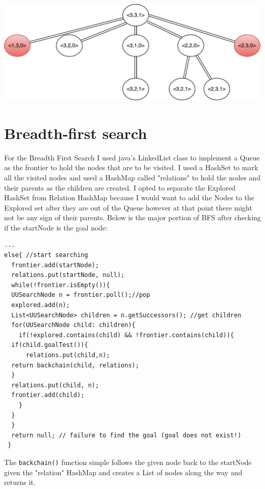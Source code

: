\documentclass{article}
\begin{document}
\includegraphics[scale=0.75]{states2}

\section{Breadth-first search}
For the Breadth First Search I used java's LinkedList class to implement a Queue as the frontier to hold the nodes that are to be visited.
I used a HashSet to mark all the visited nodes and used a HashMap called "relations" to hold the nodes and their parents as the children are created. I opted to separate the Explored HashSet from Relation HashMap because I would want to add the Nodes to the Explored set after they are out of the Queue however at that point there might not be any sign of their parents.
Below is the major portion of BFS after checking if the startNode is the goal node:
\begin{lstlisting}
...
else{ //start searching
  frontier.add(startNode);
  relations.put(startNode, null);
  while(!frontier.isEmpty()){
  UUSearchNode n = frontier.poll();//pop
  explored.add(n);
  List<UUSearchNode> children = n.getSuccessors(); //get children
  for(UUSearchNode child: children){
    if(!explored.contains(child) && !frontier.contains(child)){
  if(child.goalTest()){
  	  relations.put(child,n);
  return backchain(child, relations);
  }
  relations.put(child, n);
  frontier.add(child);
    }
  }
  }
  return null; // failure to find the goal (goal does not exist!)
 }
\end{lstlisting}

The \verb`backchain()` function simple follows the given node back to the startNode given the "relation" HashMap and creates a List of nodes along the way and returns it.
\end{document}
